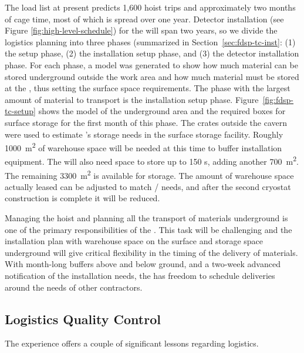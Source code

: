 The load list at present predicts 1,600 hoist trips and approximately two  months of cage time, most of which is spread over one year. 
Detector installation (see Figure \ref{fig:high-level-schedule}) for the  will span two years, so we divide the logistics planning into three phases (summarized in Section~\ref{sec:fdsp-tc-inst}: %
 (1) the  setup phase, (2) the installation setup phase, and (3) the detector installation phase. 
For each phase, a \threed model was generated to show how much material can be stored underground outside the work area and how much material must be stored 
at the , thus setting the surface space requirements. 
The phase with the largest amount of material to transport is the installation setup phase.  
Figure~\ref{fig:fdsp-tc-setup} shows the model of the underground area and the required boxes for surface storage for the first month of this phase. 
The crates outside the cavern were used to estimate 's storage needs in the surface storage facility. Roughly \SI{1000}{\square\meter} of warehouse space will be needed at this time to buffer  installation equipment.  The  will also need space to store up to 150 s, adding another \SI{700}{\square\meter}. The remaining \SI{3300}{\square\meter} is available for  storage. The amount of warehouse space  actually leased can be adjusted to match / needs, and after the second cryostat construction is complete it will be reduced. 

Managing the hoist and planning all the transport of materials underground is one of the primary responsibilities of the . This task will be challenging and the installation plan with warehouse space on the surface and storage space underground will give critical flexibility in the timing of the delivery of materials. With month-long buffers above and below ground, and a two-week advanced notification of the installation needs, the  has freedom to schedule deliveries around the needs of other contractors.


\subsection{Logistics Quality Control}
\label{sec:fdsp-tc-log-qaqc}


 
The  experience offers a couple of significant lessons regarding logistics.

